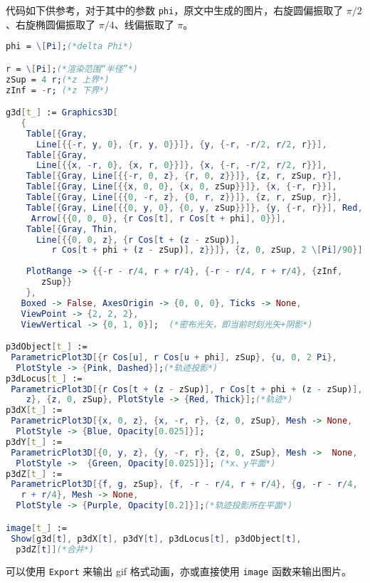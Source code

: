 

\begin{issues}
\issueDraft
\end{issues}

代码如下供参考，对于其中的参数 \verb`phi`，原文中生成的图片，右旋圆偏振取了 $\pi/2$、右旋椭圆偏振取了 $\pi/4$、线偏振取了 $\pi$。


\begin{lstlisting}[language=Mathematica]
phi = \[Pi];(*delta Phi*)

r = \[Pi];(*渲染范围“半径”*)
zSup = 4 r;(*z 上界*)
zInf = -r; (*z 下界*)

g3d[t_] := Graphics3D[
   {
    Table[{Gray, 
      Line[{{-r, y, 0}, {r, y, 0}}]}, {y, {-r, -r/2, r/2, r}}],
    Table[{Gray, 
      Line[{{x, -r, 0}, {x, r, 0}}]}, {x, {-r, -r/2, r/2, r}}],
    Table[{Gray, Line[{{-r, 0, z}, {r, 0, z}}]}, {z, r, zSup, r}],
    Table[{Gray, Line[{{x, 0, 0}, {x, 0, zSup}}]}, {x, {-r, r}}],
    Table[{Gray, Line[{{0, -r, z}, {0, r, z}}]}, {z, r, zSup, r}],
    Table[{Gray, Line[{{0, y, 0}, {0, y, zSup}}]}, {y, {-r, r}}], Red,
     Arrow[{{0, 0, 0}, {r Cos[t], r Cos[t + phi], 0}}],
    Table[{Gray, Thin, 
      Line[{{0, 0, z}, {r Cos[t + (z - zSup)], 
         r Cos[t + phi + (z - zSup)], z}}]}, {z, 0, zSup, 2 \[Pi]/90}],
    
    PlotRange -> {{-r - r/4, r + r/4}, {-r - r/4, r + r/4}, {zInf, 
       zSup}}
    }, 
   Boxed -> False, AxesOrigin -> {0, 0, 0}, Ticks -> None, 
   ViewPoint -> {2, 2, 2}, 
   ViewVertical -> {0, 1, 0}];  (*密布光矢，即当前时刻光矢+阴影*)

p3dObject[t_] := 
 ParametricPlot3D[{r Cos[u], r Cos[u + phi], zSup}, {u, 0, 2 Pi}, 
  PlotStyle -> {Pink, Dashed}];(*轨迹投影*)
p3dLocus[t_] := 
 ParametricPlot3D[{r Cos[t + (z - zSup)], r Cos[t + phi + (z - zSup)],
    z}, {z, 0, zSup}, PlotStyle -> {Red, Thick}];(*轨迹*)
p3dX[t_] := 
 ParametricPlot3D[{x, 0, z}, {x, -r, r}, {z, 0, zSup}, Mesh -> None, 
  PlotStyle -> {Blue, Opacity[0.025]}];
p3dY[t_] := 
 ParametricPlot3D[{0, y, z}, {y, -r, r}, {z, 0, zSup}, Mesh ->  None, 
  PlotStyle ->  {Green, Opacity[0.025]}]; (*x、y平面*)
p3dZ[t_] := 
 ParametricPlot3D[{f, g, zSup}, {f, -r - r/4, r + r/4}, {g, -r - r/4, 
   r + r/4}, Mesh -> None, 
  PlotStyle -> {Purple, Opacity[0.2]}];(*轨迹投影所在平面*)

image[t_] := 
 Show[g3d[t], p3dX[t], p3dY[t], p3dLocus[t], p3dObject[t], 
  p3dZ[t]](*合并*)
\end{lstlisting}

可以使用 \verb`Export` 来输出 gif 格式动画，亦或直接使用 \verb`image` 函数来输出图片。